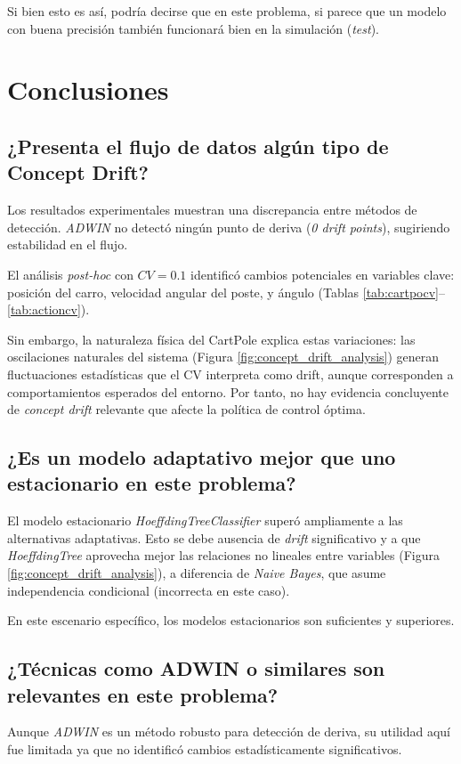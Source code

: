 \documentclass[12pt,letterpaper]{article}
\begin{document}
Si bien esto es así, podría decirse que en este problema, si parece que un modelo con buena precisión también funcionará bien en la simulación (\textit{test}).

\section{Conclusiones}

\subsection{¿Presenta el flujo de datos algún tipo de Concept Drift?}
Los resultados experimentales muestran una discrepancia entre métodos de detección.
\textit{ADWIN} no detectó ningún punto de deriva (\textit{0 drift points}), sugiriendo estabilidad en el flujo.

El análisis \textit{post-hoc} con $CV=0.1$ identificó cambios potenciales en variables clave: posición del carro, velocidad angular del poste, y ángulo (Tablas \ref{tab:cartpocv}--\ref{tab:actioncv}).

Sin embargo, la naturaleza física del CartPole explica estas variaciones: las oscilaciones naturales del sistema (Figura \ref{fig:concept_drift_analysis}) generan fluctuaciones estadísticas que el CV interpreta como drift, aunque corresponden a comportamientos esperados del entorno. Por tanto, no hay evidencia concluyente de \textit{concept drift} relevante que afecte la política de control óptima.

\subsection{¿Es un modelo adaptativo mejor que uno estacionario en este problema?}
El modelo estacionario \textit{HoeffdingTreeClassifier} superó ampliamente a las alternativas adaptativas. Esto se debe ausencia de \textit{drift} significativo y a que \textit{HoeffdingTree} aprovecha mejor las relaciones no lineales entre variables (Figura \ref{fig:concept_drift_analysis}), a diferencia de \textit{Naive Bayes}, que asume independencia condicional (incorrecta en este caso).

En este escenario específico, los modelos estacionarios son suficientes y superiores.

\subsection{¿Técnicas como ADWIN o similares son relevantes en este problema?}
Aunque \textit{ADWIN} es un método robusto para detección de deriva, su utilidad aquí fue limitada ya que no identificó cambios estadísticamente significativos.
\end{document}
